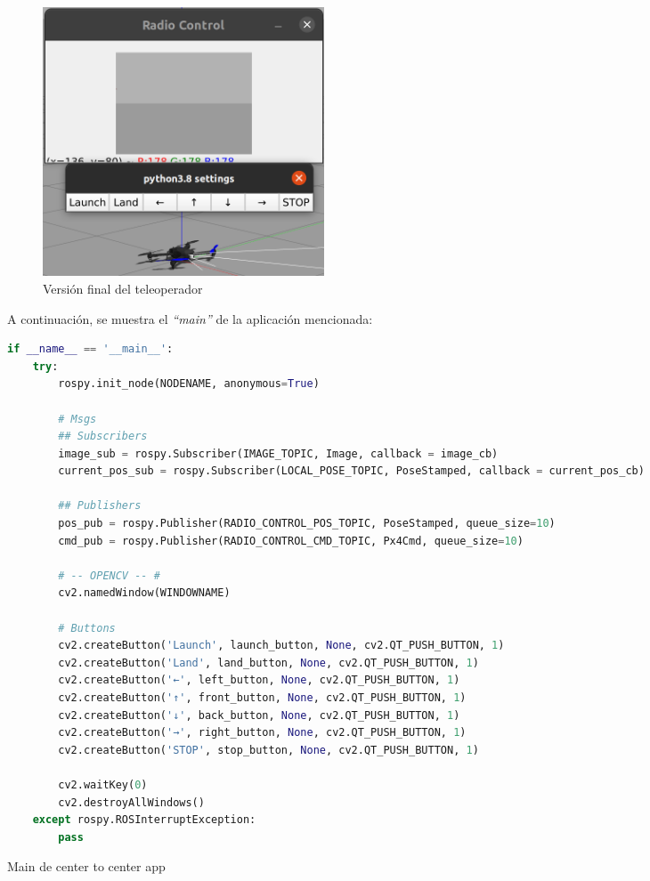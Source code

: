\begin{figure} [H]
	\begin{center}
	\includegraphics[height=8cm]{imagenes/cap4/3_c2c_gui.png}
	\end{center}
	\caption[Versión final del teleoperador]{Versión final del teleoperador}
	\label{fig:teleoperador_end}
\end{figure}

A continuación, se muestra el \emph{``main''} de la aplicación mencionada:\\

\begin{code}[H]
\begin{lstlisting}[language=Python]
if __name__ == '__main__':
    try:
        rospy.init_node(NODENAME, anonymous=True)

        # Msgs
        ## Subscribers
        image_sub = rospy.Subscriber(IMAGE_TOPIC, Image, callback = image_cb)
        current_pos_sub = rospy.Subscriber(LOCAL_POSE_TOPIC, PoseStamped, callback = current_pos_cb)

        ## Publishers
        pos_pub = rospy.Publisher(RADIO_CONTROL_POS_TOPIC, PoseStamped, queue_size=10)
        cmd_pub = rospy.Publisher(RADIO_CONTROL_CMD_TOPIC, Px4Cmd, queue_size=10)

        # -- OPENCV -- #
        cv2.namedWindow(WINDOWNAME)

        # Buttons
        cv2.createButton('Launch', launch_button, None, cv2.QT_PUSH_BUTTON, 1)
        cv2.createButton('Land', land_button, None, cv2.QT_PUSH_BUTTON, 1)
        cv2.createButton('←', left_button, None, cv2.QT_PUSH_BUTTON, 1)
        cv2.createButton('↑', front_button, None, cv2.QT_PUSH_BUTTON, 1)
        cv2.createButton('↓', back_button, None, cv2.QT_PUSH_BUTTON, 1)
        cv2.createButton('→', right_button, None, cv2.QT_PUSH_BUTTON, 1)
        cv2.createButton('STOP', stop_button, None, cv2.QT_PUSH_BUTTON, 1)

        cv2.waitKey(0)
        cv2.destroyAllWindows()
    except rospy.ROSInterruptException:
        pass
\end{lstlisting}
\caption[Main de center to center app]{Main de center to center app}
\label{cod:c2c_app}
\end{code}

